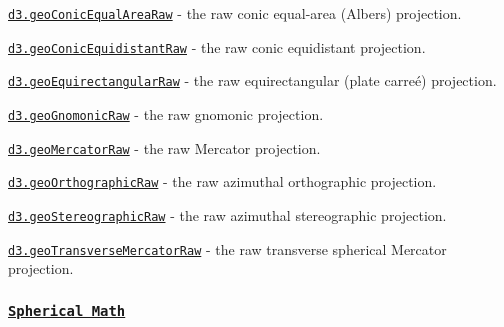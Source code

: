 \begin{DoxyItemize}
\item \href{https://github.com/d3/d3-geo/blob/master/README.md#geoConicEqualAreaRaw}{\tt d3.\+geo\+Conic\+Equal\+Area\+Raw} -\/ the raw conic equal-\/area (Albers) projection.
\item \href{https://github.com/d3/d3-geo/blob/master/README.md#geoConicEquidistantRaw}{\tt d3.\+geo\+Conic\+Equidistant\+Raw} -\/ the raw conic equidistant projection.
\item \href{https://github.com/d3/d3-geo/blob/master/README.md#geoEquirectangularRaw}{\tt d3.\+geo\+Equirectangular\+Raw} -\/ the raw equirectangular (plate carreé) projection.
\item \href{https://github.com/d3/d3-geo/blob/master/README.md#geoGnomonicRaw}{\tt d3.\+geo\+Gnomonic\+Raw} -\/ the raw gnomonic projection.
\item \href{https://github.com/d3/d3-geo/blob/master/README.md#geoMercatorRaw}{\tt d3.\+geo\+Mercator\+Raw} -\/ the raw Mercator projection.
\item \href{https://github.com/d3/d3-geo/blob/master/README.md#geoOrthographicRaw}{\tt d3.\+geo\+Orthographic\+Raw} -\/ the raw azimuthal orthographic projection.
\item \href{https://github.com/d3/d3-geo/blob/master/README.md#geoStereographicRaw}{\tt d3.\+geo\+Stereographic\+Raw} -\/ the raw azimuthal stereographic projection.
\item \href{https://github.com/d3/d3-geo/blob/master/README.md#geoTransverseMercatorRaw}{\tt d3.\+geo\+Transverse\+Mercator\+Raw} -\/ the raw transverse spherical Mercator projection.
\end{DoxyItemize}

\subsubsection*{\href{https://github.com/d3/d3-geo/blob/master/README.md#spherical-math}{\tt Spherical Math}}



